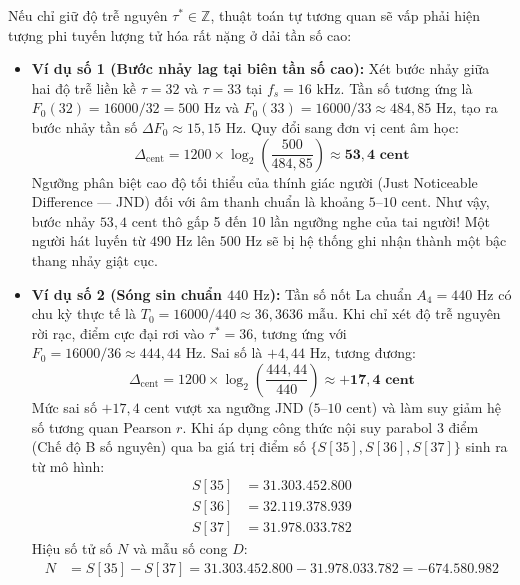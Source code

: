 \documentclass[11pt,a4paper]{article}
\begin{document}
Nếu chỉ giữ độ trễ nguyên $\tau^* \in \mathbb{Z}$, thuật toán tự tương quan sẽ vấp phải hiện tượng phi tuyến lượng tử hóa rất nặng ở dải tần số cao:
\begin{itemize}
    \setlength{\itemsep}{1.5pt}
    \item \textbf{Ví dụ số 1 (Bước nhảy lag tại biên tần số cao):} Xét bước nhảy giữa hai độ trễ liền kề $\tau = 32$ và $\tau = 33$ tại $f_s = 16\text{ kHz}$. Tần số tương ứng là $F_0(32) = 16000/32 = 500\text{ Hz}$ và $F_0(33) = 16000/33 \approx 484{,}85\text{ Hz}$, tạo ra bước nhảy tần số $\Delta F_0 \approx 15{,}15\text{ Hz}$. Quy đổi sang đơn vị cent âm học:
    \begin{equation}
    \Delta_{\text{cent}} = 1200 \times \log_2\left(\frac{500}{484{,}85}\right) \approx \mathbf{53{,}4\text{ cent}}
    \end{equation}
    Ngưỡng phân biệt cao độ tối thiểu của thính giác người (Just Noticeable Difference --- JND) đối với âm thanh chuẩn là khoảng $5\text{--}10\text{ cent}$. Như vậy, bước nhảy $53{,}4\text{ cent}$ thô gấp 5 đến 10 lần ngưỡng nghe của tai người! Một người hát luyến từ $490\text{ Hz}$ lên $500\text{ Hz}$ sẽ bị hệ thống ghi nhận thành một bậc thang nhảy giật cục.
    \item \textbf{Ví dụ số 2 (Sóng sin chuẩn $440\text{ Hz}$):} Tần số nốt La chuẩn $A_4 = 440\text{ Hz}$ có chu kỳ thực tế là $T_0 = 16000 / 440 \approx 36{,}3636\text{ mẫu}$. Khi chỉ xét độ trễ nguyên rời rạc, điểm cực đại rơi vào $\tau^* = 36$, tương ứng với $F_0 = 16000 / 36 \approx 444{,}44\text{ Hz}$. Sai số là $+4{,}44\text{ Hz}$, tương đương:
    \begin{equation}
    \Delta_{\text{cent}} = 1200 \times \log_2\left(\frac{444{,}44}{440}\right) \approx \mathbf{+17{,}4\text{ cent}}
    \end{equation}
    Mức sai số $+17{,}4\text{ cent}$ vượt xa ngưỡng JND ($5\text{--}10\text{ cent}$) và làm suy giảm hệ số tương quan Pearson $r$. Khi áp dụng công thức nội suy parabol 3 điểm (Chế độ B số nguyên) qua ba giá trị điểm số $\{S[35], S[36], S[37]\}$ sinh ra từ mô hình:
    \begin{align}
    S[35] &= 31.303.452.800 \nonumber \\
    S[36] &= 32.119.378.939 \nonumber \\
    S[37] &= 31.978.033.782
    \end{align}
    Hiệu số tử số $N$ và mẫu số cong $D$:
    \begin{align}
    N &= S[35] - S[37] = 31.303.452.800 - 31.978.033.782 = -674.580.982 \nonumber \\

\end{align}
\end{itemize}
\end{document}
